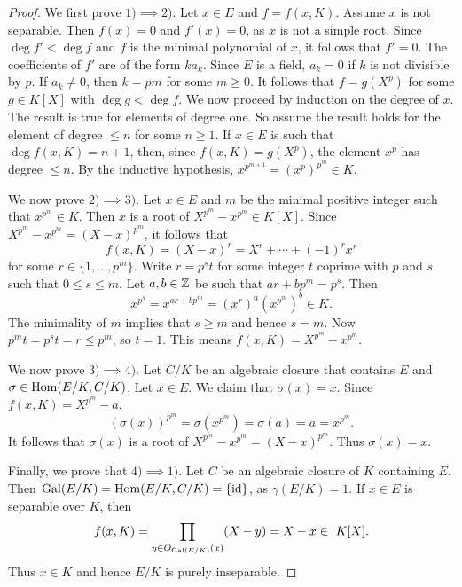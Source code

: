 \begin{proof}
    We first prove $1)\implies 2)$. 
    Let $x\in E$ and $f=f(x,K)$. Assume $x$ is not separable. Then
    $f(x)=0$ and $f'(x)=0$, as $x$ is not a simple root. Since $\deg f'<\deg f$
    and $f$ is the minimal polynomial of $x$, it follows that 
    $f'=0$. The coefficients of $f'$ are of the form $ka_k$. 
    Since $E$ is a field, $a_k=0$ if $k$ is not divisible by $p$. If $a_k\ne 0$, 
    then $k=pm$ for some $m\geq0$. It follows that $f=g(X^p)$
    for some $g\in K[X]$ with $\deg g<\deg f$. 
    We now proceed by induction on the degree of $x$. The result
    is true for elements of degree one. So assume the result holds for the element of degree $\leq n$ 
    for some $n\geq1$. 
    If $x\in E$ is such that $\deg f(x,K)=n+1$, then, since $f(x,K)=g(X^p)$, the element 
    $x^p$ has degree $\leq n$. By the inductive hypothesis, $x^{p^{m+1}}=(x^p)^{p^m}\in K$.  

    We now prove $2)\implies 3)$. Let $x\in E$ and $m$ be the minimal positive integer 
    such that $x^{p^m}\in K$. Then
    $x$ is a root of $X^{p^m}-x^{p^m}\in K[X]$. Since 
    $X^{p^m}-x^{p^m}=(X-x)^{p^m}$, it follows that 
    \[
    f(x,K)=(X-x)^r=X^r+\cdots+(-1)^rx^r
    \]
    for some
    $r\in\{1,\dots,p^m\}$. Write $r=p^st$ for some integer $t$ coprime with $p$ and $s$ such that
    $0\leq s\leq m$. Let $a,b\in\mathbb{Z}$ be such that $ar+bp^m=p^s$. Then 
    \[
    x^{p^s}=x^{ar+bp^m}=\left(x^r\right)^a\left(x^{p^m}\right)^b\in K.
    \]
    The minimality of $m$ implies that $s\geq m$ and hence $s=m$. Now $p^mt=p^st=r\leq p^m$, so $t=1$. 
    This means $f(x,K)=X^{p^m}-x^{p^m}$. 
    
    We now prove $3)\implies 4)$. Let $C/K$ be an algebraic closure that contains $E$
    and $\sigma\in\operatorname{Hom}(E/K,C/K)$. Let $x\in E$. We claim that $\sigma(x)=x$. Since 
    $f(x,K)=X^{p^m}-a$, 
    \[
    \left(\sigma(x)\right)^{p^m}=\sigma\left(x^{p^m}\right)=\sigma(a)=a=x^{p^m}.
    \]
    It follows that $\sigma(x)$ is a root of $X^{p^m}-x^{p^m}=(X-x)^{p^m}$. 
    Thus $\sigma(x)=x$. 
    
    Finally, we prove that $4)\implies1)$. Let 
    $C$ be an algebraic closure of $K$ containing $E$. 
    Then $\operatorname{Gal}(E/K)=\operatorname{Hom}(E/K,C/K)=\{\operatorname{id}\}$, as $\gamma(E/K)=1$. 
    If $x\in E$ is separable over $K$, then
    \[
    f(x,K)=\prod_{y\in O_{\operatorname{Gal}(E/K)}(x)}(X-y)=X-x\in\ K[X].
    \]
    Thus $x\in K$ and hence $E/K$ is purely inseparable. 
\end{proof}

